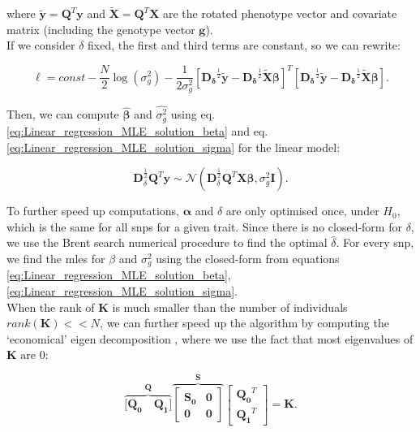where $\tilde{\mathbf{y}} = \mathbf{Q}^T\mathbf{y}$ and $\tilde{\mathbf{X}}= \mathbf{Q}^T\mathbf{X}$ are the rotated phenotype vector and covariate matrix (including the genotype vector $\mathbf{g}$). \\

If we consider $\delta$ fixed, the first and third terms are constant, so we can rewrite:

\begin{equation}
    \ell = const - \frac{N}{2} \log(\sigma_g^2) - \frac{1}{2\sigma_g^2}[\mathbf{D_{\delta}}^{\frac{1}{2}}\tilde{\mathbf{y}}-\mathbf{D_{\delta}}^{\frac{1}{2}}\tilde{\mathbf{X}}\boldsymbol{\beta}]^T[\mathbf{D_{\delta}}^{\frac{1}{2}}\tilde{\mathbf{y}}-\mathbf{D_{\delta}}^{\frac{1}{2}}\tilde{\mathbf{X}}\boldsymbol{\beta}].
\end{equation}

Then, we can compute $\hat{\boldsymbol{\beta}}$ and $\hat{\sigma_g^2}$ using eq. \eqref{eq:Linear_regression_MLE_solution_beta} and eq. \eqref{eq:Linear_regression_MLE_solution_sigma} for the linear model:

\begin{equation}
    \mathbf{D}^{\frac{1}{2}}_{\delta}\mathbf{Q}^{T}\mathbf{y} \sim \mathcal{N}(\mathbf{D}^{\frac{1}{2}}_{\delta}\mathbf{Q}^{T}\mathbf{X}\boldsymbol{\beta}, \sigma_g^2\mathbf{I}).
\end{equation} 

To further speed up computations, $\boldsymbol{\alpha}$ and $\delta$ are only optimised once, under $H_0$, which is the same for all \gls{snp}s for a given trait.
Since there is no closed-form for $\delta$, we use the Brent search numerical procedure \cite{goddard2009estimating} to find the optimal $\hat{\delta}$.
For every \gls{snp}, we find the \gls{mle}s for $\beta$ and $\sigma^2_g$ using the closed-form from equations \eqref{eq:Linear_regression_MLE_solution_beta},\eqref{eq:Linear_regression_MLE_solution_sigma}.\\

When the rank of $\mathbf{K}$ is much smaller than the number of individuals $rank(\mathbf{K}) << N$,  we can further speed up the algorithm by computing the `economical' eigen decomposition \cite{lippert2011fast}, where we use the fact that most eigenvalues of $\mathbf{K}$ are 0:

\begin{equation}\label{eq:economic_eigen_decomposition}
    \overbrace{[\mathbf{Q_0} \quad \mathbf{Q_1]}}^{\mathbf{Q}}
            \overbrace{\left[\begin{array}{cc}
                \mathbf{S_0} & \mathbf{0}\\
                        \mathbf{0} & \mathbf{0}
            \end{array}\right]}^{\mathbf{S}}
        \left[\begin{array}{c}
            \mathbf{Q_0}^T \\
            \mathbf{Q_1}^T
        \end{array}\right] = \mathbf{K}.
\end{equation}\\

